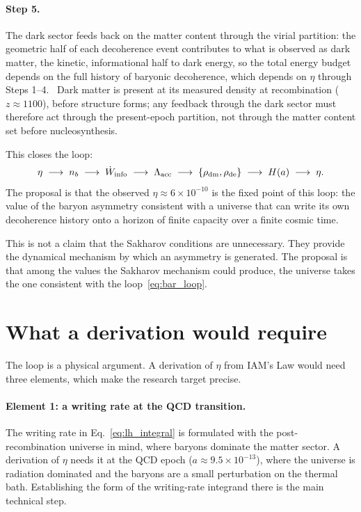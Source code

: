 \paragraph{Step 5.} The dark sector feeds back on the matter content through the virial partition: the geometric half of each
decoherence event contributes to what is observed as dark matter, the kinetic, informational half to dark energy, so the total energy
budget depends on the full history of baryonic decoherence, which depends on $\eta$ through Steps 1--4. \conjecture\ Dark matter is
present at its measured density at recombination ($z\approx1100$), before structure forms; any feedback through the dark sector must
therefore act through the present-epoch partition, not through the matter content set before nucleosynthesis. \observed

This closes the loop:
\begin{equation}
\eta\;\longrightarrow\;n_b\;\longrightarrow\;\dot W_{\rm info}\;\longrightarrow\;\Lambda_{\rm acc}\;\longrightarrow\;
\{\rho_{\rm dm},\rho_{\rm de}\}\;\longrightarrow\;H(a)\;\longrightarrow\;\eta .\label{eq:bar_loop}
\end{equation}
The proposal is that the observed $\eta\approx6\times10^{-10}$ is the fixed point of this loop: the value of the baryon asymmetry
consistent with a universe that can write its own decoherence history onto a horizon of finite capacity over a finite cosmic time.
\conjecture

This is not a claim that the Sakharov conditions are unnecessary. They provide the dynamical mechanism by which an asymmetry is
generated. The proposal is that among the values the Sakharov mechanism could produce, the universe takes the one consistent with the
loop~\eqref{eq:bar_loop}. \conjecture

\section{What a derivation would require}\label{sec:bar_derivation}
The loop is a physical argument. A derivation of $\eta$ from IAM's Law would need three elements, which
make the research target precise.

\paragraph{Element 1: a writing rate at the QCD transition.} The writing rate in Eq.~\eqref{eq:lh_integral} is formulated with the
post-recombination universe in mind, where baryons dominate the matter sector. A derivation of $\eta$ needs it at the QCD epoch
($a\approx9.5\times10^{-13}$), where the universe is radiation dominated and the baryons are a small perturbation on the thermal bath. Establishing the form of the writing-rate integrand there is the main technical step. \openprob

